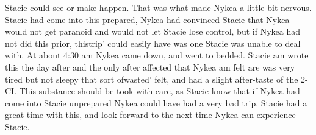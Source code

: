 \documentclass[12pt]{book}
\begin{document}
Stacie could see or make happen. That was what made Nykea a little bit nervous. Stacie had come into this prepared, Nykea had convinced Stacie that Nykea would not get paranoid and would not let Stacie lose control, but if Nykea had not did this prior, thistrip' could easily have was one Stacie was unable to deal with. At about 4:30 am Nykea came down, and went to bedded. Stacie am wrote this the day after and the only after affected that Nykea am felt are was very tired but not sleepy that sort ofwasted' felt, and had a slight after-taste of the 2-CI. This substance should be took with care, as Stacie know that if Nykea had come into Stacie unprepared Nykea could have had a very bad trip. Stacie had a great time with this, and look forward to the next time Nykea can experience Stacie.
\end{document}

